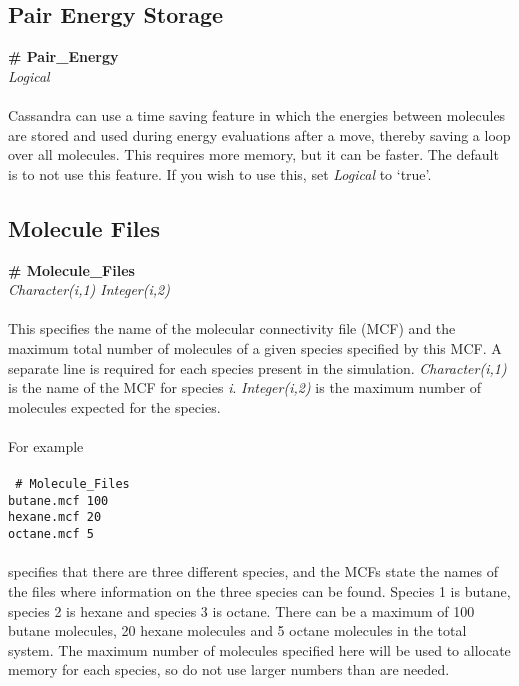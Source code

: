 \subsection{Pair Energy Storage}\label{sec:Pair_Energy}
{\bf \# Pair\_Energy} \\
{\it Logical} \\ \\
%
Cassandra can use a time saving feature in which the energies between
molecules are stored and used during energy evaluations after a move,
thereby saving a loop over all molecules. 
This requires more memory, but it can be faster. 
The default is to not use this feature. 
If you wish to use this, set {\it Logical} to `true'. 
%
%
%
%
\subsection{Molecule Files}\label{sec:Molecule_Files}
{\bf \# Molecule\_Files} \\
{\it Character(i,1) Integer(i,2)}  \\ \\
%
This specifies the name of the molecular connectivity file (MCF) and
the maximum total number of molecules of a given species specified by this MCF.
A separate line is required for each species present in the simulation. 
{\it Character(i,1)} is the name of the MCF for species {\it i}. 
{\it Integer(i,2)} is the maximum number of molecules expected for the species.  \\ \\
For example \\ \\
\texttt{
\# Molecule\_Files \\
butane.mcf 100 \\
hexane.mcf 20\\
octane.mcf 5} \\ \\
specifies that there are three different species, and the MCFs
state the names of the files where information on the three species
can be found. 
Species 1 is butane, species 2 is hexane and species 3 is octane. 
There can be a maximum of 100 butane molecules, 20 hexane molecules 
and 5 octane molecules in the total system. 
The maximum
number of molecules specified here will be used to allocate memory for
each species, so do not use larger numbers than are needed. 
%
%
